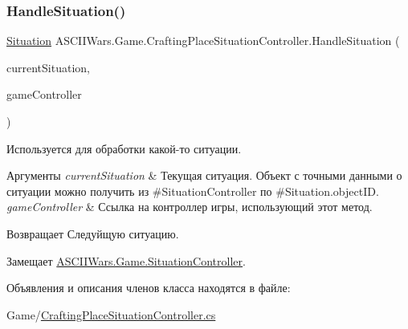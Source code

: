\subsubsection{\texorpdfstring{Handle\+Situation()}{HandleSituation()}}
{\footnotesize\ttfamily \hyperlink{class_a_s_c_i_i_wars_1_1_game_1_1_situation}{Situation} A\+S\+C\+I\+I\+Wars.\+Game.\+Crafting\+Place\+Situation\+Controller.\+Handle\+Situation (\begin{DoxyParamCaption}\item[{\hyperlink{class_a_s_c_i_i_wars_1_1_game_1_1_situation}{Situation}}]{current\+Situation,  }\item[{\hyperlink{class_a_s_c_i_i_wars_1_1_game_1_1_game_controller}{Game\+Controller}}]{game\+Controller }\end{DoxyParamCaption})\hspace{0.3cm}{\ttfamily [inline]}}



Используется для обработки какой-\/то ситуации. 


\begin{DoxyParams}{Аргументы}
{\em current\+Situation} & Текущая ситуация. Объект с точными данными о ситуации можно получить из \#\+Situation\+Controller по \#\+Situation.\+object\+ID. \\
\hline
{\em game\+Controller} & Ссылка на контроллер игры, использующий этот метод. \\
\hline
\end{DoxyParams}
\begin{DoxyReturn}{Возвращает}
Следуйщую ситуацию. 
\end{DoxyReturn}


Замещает \hyperlink{interface_a_s_c_i_i_wars_1_1_game_1_1_situation_controller_a2cf0359dfc1683beb63f0dfed1c372e6}{A\+S\+C\+I\+I\+Wars.\+Game.\+Situation\+Controller}.



Объявления и описания членов класса находятся в файле\+:\begin{DoxyCompactItemize}
\item 
Game/\hyperlink{_crafting_place_situation_controller_8cs}{Crafting\+Place\+Situation\+Controller.\+cs}\end{DoxyCompactItemize}
